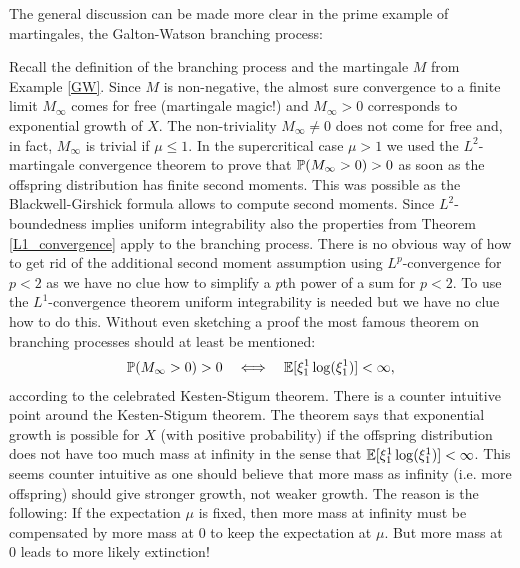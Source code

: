 The general discussion can be made more clear in the prime example of martingales, the Galton-Watson branching process:
\begin{example}
	Recall the definition of the branching process and the martingale $M$ from Example \ref{GW}. Since $M$ is non-negative, the almost sure convergence to a finite limit $M_\infty$ comes for free (martingale magic!) and $M_\infty>0$ corresponds to exponential growth of $X$. The non-triviality $M_\infty\neq 0$ does not come for free and, in fact, $M_\infty$ is trivial if $\mu\leq 1$. In the supercritical case $\mu>1$ we used the $L^2$-martingale convergence theorem to prove that $\P(M_\infty>0)>0$ as soon as the offspring distribution has finite second moments. This was possible as the Blackwell-Girshick formula allows to compute second moments. Since $L^2$-boundedness implies uniform integrability also the properties from Theorem \ref{L1_convergence} apply to the branching process. There is no obvious way of how to get rid of the additional second moment assumption using $L^p$-convergence for $p<2$ as we have no clue how to simplify a $p$th power of a sum for $p<2$. To use the $L^1$-convergence theorem uniform integrability is needed but we have no clue how to do this. Without even sketching a proof the most famous theorem on branching processes should at least be mentioned:
	\begin{align*}
		\P(M_\infty>0)>0\quad \Longleftrightarrow\quad \E[\xi_1^1 \log(\xi_1^1)]<\infty,
	\end{align*}
according to the celebrated Kesten-Stigum theorem. There is a counter intuitive point around the Kesten-Stigum theorem. The theorem says that exponential growth is possible for $X$ (with positive probability) if the offspring distribution does not have too much mass at infinity in the sense that $\E[\xi_1^1 \log(\xi_1^1)]<\infty$. This seems counter intuitive  as one should believe that more mass as infinity (i.e. more offspring) should give stronger growth, not weaker growth. The reason is the following: If the expectation $\mu$ is fixed, then more mass at infinity must be compensated by more mass at $0$ to keep the expectation at $\mu$. But more mass at $0$ leads to more likely extinction!



\end{example}


